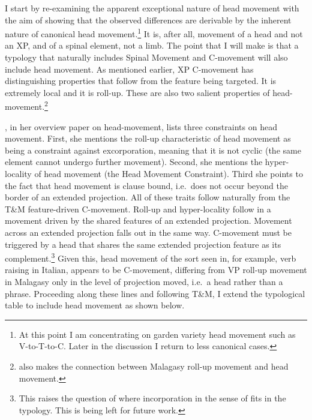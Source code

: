 \documentclass[output=paper,colorlinks,citecolor=brown,
]{langscibook}
\begin{document}
I start by re-examining the apparent exceptional nature of head movement with the aim of showing that the observed differences are derivable by the inherent nature of canonical head movement.\footnote{At this point I am concentrating on garden variety head movement such as V-to-T-to-C.  Later in the discussion I  return to less canonical cases.}  It is, after all, movement of a head and not an XP, and of a spinal element, not a limb.   The point that I will make is that a typology that naturally includes Spinal Movement and C-movement will also include head movement. As mentioned earlier, XP C-movement has distinguishing properties that follow from the feature being targeted.  It is extremely local and it is roll-up.  These are also two salient properties of head-movement.\footnote{\citet{Pearson:2000} also makes the connection between Malagasy roll-up movement and head movement.}  

\citet{Dekany:2018}, in her overview paper on head-movement, lists three constraints on head movement.  First,  she mentions the roll-up characteristic of head movement as being a constraint against excorporation, meaning that it is not cyclic (the same element cannot undergo further movement).   Second, she mentions the hyper-locality of head movement (the Head Movement Constraint).  Third she points to the fact that head movement is clause bound, i.e.\ does not occur beyond the border of an extended projection.  All of these traits follow naturally from the T\&M feature-driven C-movement.  Roll-up and hyper-locality follow in a movement driven by the shared features of an extended projection.  Movement across an extended projection  falls out in the same way.  C-movement must be triggered by a head that shares the same extended projection feature as its complement.\footnote{This raises the question of where incorporation in the sense of \citet{Baker:1988c} fits in the typology.  This is being left for future work.}  Given this, head movement of the sort seen in, for example, verb raising in Italian, appears to be C-movement, differing from VP roll-up movement in Malagasy only in the level of projection moved, i.e.\ a head rather than a phrase.  Proceeding along these lines and following T\&M, I extend the typological table to include head movement as shown below.
\end{document}
